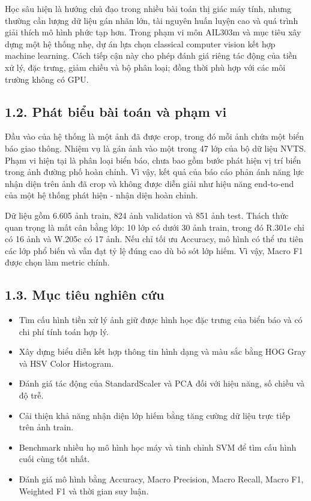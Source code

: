 \documentclass[12pt,a4paper]{article}
\begin{document}
Học sâu hiện là hướng chủ đạo trong nhiều bài toán thị giác máy tính,
nhưng thường cần lượng dữ liệu gán nhãn lớn, tài nguyên huấn luyện cao
và quá trình giải thích mô hình phức tạp hơn. Trong phạm vi môn AIL303m
và mục tiêu xây dựng một hệ thống nhẹ, dự án lựa chọn classical computer
vision kết hợp machine learning. Cách tiếp cận này cho phép đánh giá
riêng tác động của tiền xử lý, đặc trưng, giảm chiều và bộ phân loại;
đồng thời phù hợp với các môi trường không có GPU.

\subsection{1.2. Phát biểu bài toán và phạm
vi}\label{phuxe1t-biux1ec3u-buxe0i-touxe1n-vuxe0-phux1ea1m-vi}

Đầu vào của hệ thống là một ảnh đã được crop, trong đó mỗi ảnh chứa một
biển báo giao thông. Nhiệm vụ là gán ảnh vào một trong 47 lớp của bộ dữ
liệu NVTS. Phạm vi hiện tại là phân loại biển báo, chưa bao gồm bước
phát hiện vị trí biển trong ảnh đường phố hoàn chỉnh. Vì vậy, kết quả
của báo cáo phản ánh năng lực nhận diện trên ảnh đã crop và không được
diễn giải như hiệu năng end-to-end của một hệ thống phát hiện - nhận
diện hoàn chỉnh.

Dữ liệu gồm 6.605 ảnh train, 824 ảnh validation và 851 ảnh test. Thách
thức quan trọng là mất cân bằng lớp: 10 lớp có dưới 30 ảnh train, trong
đó R.301e chỉ có 16 ảnh và W.205c có 17 ảnh. Nếu chỉ tối ưu Accuracy, mô
hình có thể ưu tiên các lớp phổ biến và vẫn đạt tỷ lệ đúng cao dù bỏ sót
lớp hiếm. Vì vậy, Macro F1 được chọn làm metric chính.

\subsection{1.3. Mục tiêu nghiên
cứu}\label{mux1ee5c-tiuxeau-nghiuxean-cux1ee9u}

\begin{itemize}
\item
  Tìm cấu hình tiền xử lý ảnh giữ được hình học đặc trưng của biển báo
  và có chi phí tính toán hợp lý.
\item
  Xây dựng biểu diễn kết hợp thông tin hình dạng và màu sắc bằng HOG
  Gray và HSV Color Histogram.
\item
  Đánh giá tác động của StandardScaler và PCA đối với hiệu năng, số
  chiều và độ trễ.
\item
  Cải thiện khả năng nhận diện lớp hiếm bằng tăng cường dữ liệu trực
  tiếp trên ảnh train.
\item
  Benchmark nhiều họ mô hình học máy và tinh chỉnh SVM để tìm cấu hình
  cuối cùng tốt nhất.
\item
  Đánh giá mô hình bằng Accuracy, Macro Precision, Macro Recall, Macro
  F1, Weighted F1 và thời gian suy luận.
\end{itemize}
\end{document}
